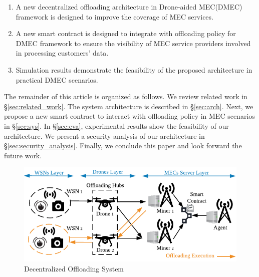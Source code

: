 \begin{enumerate}
\item A new decentralized offloading architecture in Drone-aided MEC(DMEC) framework is designed to improve the coverage of MEC services.
\item A new smart contract is designed to integrate with offloading policy for DMEC framework to ensure the visibility of MEC service providers involved in processing customers' data.
\item Simulation results demonstrate the feasibility of the proposed architecture in practical DMEC scenarios.
\end{enumerate}


The remainder of this article is organized as follows. 
We review related work in \S \ref{sec:related_work}.
The system architecture is described in \S \ref{sec:arch}.
Next, we propose a new smart contract to interact with offloading policy in MEC scenarios in \S \ref{sec:sys}.
In \S \ref{sec:eva}, experimental results show the feasibility of our architecture.
We present a security analysis of our architecture in \S \ref{sec:security_analysis}.
Finally, we conclude this paper and look forward the future work.




\begin{figure}[t]
\centering
\includegraphics[width=5 in]{Fig/Architecture_1.pdf}
\caption{Decentralized Offloading System}
\label{fig:network-arch}
\vspace*{-0.5\baselineskip}
\end{figure}

